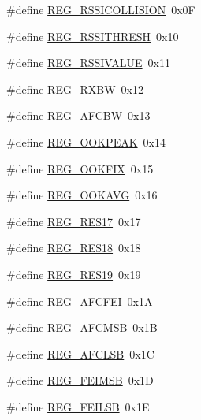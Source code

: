 \begin{DoxyCompactItemize}
\#define \mbox{\hyperlink{sx1276_regs-_fsk_8h_ad810a0e5aaa761e8edbe804df2e4f5fe}{R\+E\+G\+\_\+\+R\+S\+S\+I\+C\+O\+L\+L\+I\+S\+I\+ON}}~0x0F
\item 
\#define \mbox{\hyperlink{sx1276_regs-_fsk_8h_ab3af0df6e457f5b5f994d1c19dc2642f}{R\+E\+G\+\_\+\+R\+S\+S\+I\+T\+H\+R\+E\+SH}}~0x10
\item 
\#define \mbox{\hyperlink{sx1276_regs-_fsk_8h_a7ff36314652a235acc13fa6ab5504e3d}{R\+E\+G\+\_\+\+R\+S\+S\+I\+V\+A\+L\+UE}}~0x11
\item 
\#define \mbox{\hyperlink{sx1276_regs-_fsk_8h_a1bbbafd83ab10909a8dd5385fd0dfff8}{R\+E\+G\+\_\+\+R\+X\+BW}}~0x12
\item 
\#define \mbox{\hyperlink{sx1276_regs-_fsk_8h_aa4a7b5b5d63e9f8ef8f8dc4d7984753c}{R\+E\+G\+\_\+\+A\+F\+C\+BW}}~0x13
\item 
\#define \mbox{\hyperlink{sx1276_regs-_fsk_8h_a4a6adb6f15f5e4fe71a627d96f6f8141}{R\+E\+G\+\_\+\+O\+O\+K\+P\+E\+AK}}~0x14
\item 
\#define \mbox{\hyperlink{sx1276_regs-_fsk_8h_a585aebf4bf7b6d781ac836ade0f00aad}{R\+E\+G\+\_\+\+O\+O\+K\+F\+IX}}~0x15
\item 
\#define \mbox{\hyperlink{sx1276_regs-_fsk_8h_ad0c870505b9062bb61176ba9076e9b5e}{R\+E\+G\+\_\+\+O\+O\+K\+A\+VG}}~0x16
\item 
\#define \mbox{\hyperlink{sx1276_regs-_fsk_8h_a6a38821b7a89a409d200dbd0420c92c8}{R\+E\+G\+\_\+\+R\+E\+S17}}~0x17
\item 
\#define \mbox{\hyperlink{sx1276_regs-_fsk_8h_a855a1d320f1a948b9210dbd3a7ecc4cc}{R\+E\+G\+\_\+\+R\+E\+S18}}~0x18
\item 
\#define \mbox{\hyperlink{sx1276_regs-_fsk_8h_a1459e2972b36abc24aeed3b664cbe2c1}{R\+E\+G\+\_\+\+R\+E\+S19}}~0x19
\item 
\#define \mbox{\hyperlink{sx1276_regs-_fsk_8h_a04f60f1d03035cf80cebff9648a894c0}{R\+E\+G\+\_\+\+A\+F\+C\+F\+EI}}~0x1A
\item 
\#define \mbox{\hyperlink{sx1276_regs-_fsk_8h_a989d0164e5d5090b39e25506526e0aa5}{R\+E\+G\+\_\+\+A\+F\+C\+M\+SB}}~0x1B
\item 
\#define \mbox{\hyperlink{sx1276_regs-_fsk_8h_a4c64591ff1cb9d48f90c679a6f5985c7}{R\+E\+G\+\_\+\+A\+F\+C\+L\+SB}}~0x1C
\item 
\#define \mbox{\hyperlink{sx1276_regs-_fsk_8h_a99f252ad098770ae36c2947075ba011a}{R\+E\+G\+\_\+\+F\+E\+I\+M\+SB}}~0x1D
\item 
\#define \mbox{\hyperlink{sx1276_regs-_fsk_8h_a02e249f7bd9ca6c91dea006e205bbbe5}{R\+E\+G\+\_\+\+F\+E\+I\+L\+SB}}~0x1E

\end{DoxyCompactItemize}
